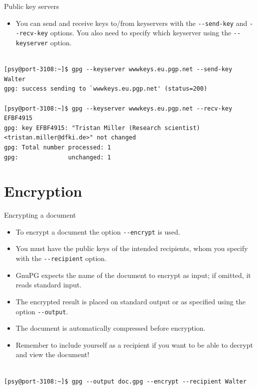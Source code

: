 \documentclass[%
mode=present,%
paper=smartboard,
size=20pt,
]{powerdot}
\newcommand{\clopt}[1]{\texttt{{-}#1}}
\begin{document}
\begin{slide}[method=direct,toc=]{Public key servers}
  \begin{itemize}
  \item You can send and receive keys to/from keyservers with the
    \clopt{-send-key} and \clopt{-recv-key} options.  You also need to
    specify which keyserver using the \clopt{-keyserver} option.
  \end{itemize}
\begin{verbatim}

[psy@port-3108:~]$ gpg --keyserver wwwkeys.eu.pgp.net --send-key Walter
gpg: success sending to `wwwkeys.eu.pgp.net' (status=200)

[psy@port-3108:~]$ gpg --keyserver wwwkeys.eu.pgp.net --recv-key EFBF4915
gpg: key EFBF4915: "Tristan Miller (Research scientist) <tristan.miller@dfki.de>" not changed
gpg: Total number processed: 1
gpg:              unchanged: 1
\end{verbatim}
\end{slide}

\section{Encryption}

\makeatletter\renewcommand{\verbatim@font}{\scriptsize\tt}\makeatother
\begin{slide}[method=direct]{Encrypting a document}
  \begin{itemize}
  \item To encrypt a document the option \clopt{-encrypt} is used.
  \item You must have the public keys of the intended recipients, whom
    you specify with the \clopt{-recipient} option.
  \item GnuPG expects the name of the document to encrypt as input; if
    omitted, it reads standard input.
  \item The encrypted result is placed on standard output or as
    specified using the option \clopt{-output}.
  \item The document is automatically compressed before encryption.
  \item Remember to include yourself as a recipient if you want to be
    able to decrypt and view the document!
  \end{itemize}
\begin{verbatim}

[psy@port-3108:~]$ gpg --output doc.gpg --encrypt --recipient Walter
\end{verbatim}%
\end{slide}
\end{document}
